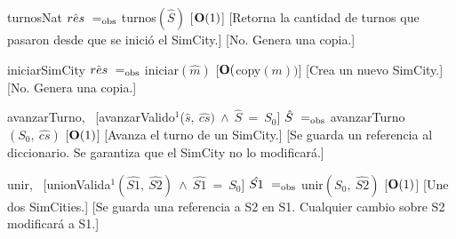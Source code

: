 \begin{Interfaz}
    \InterfazFuncion
    {turnos}{}{Nat}
    {$\hat{res}\ \igobs\ $turnos$(\hat{S})$}
    [$\bold{O}(1)$]
    [Retorna la cantidad de turnos que pasaron desde que se inició el SimCity.]
    [No. Genera una copia.]

    \InterfazFuncion
    {iniciar}{}{SimCity}
    {$\hat{res}\ \igobs\ $iniciar$(\hat{m})$}
    [$\bold{O}($copy$(m))$]
    [Crea un nuevo SimCity.]
    [No. Genera una copia.]

    \InterfazFuncion
    {avanzarTurno}{,\ }{}
    [avanzarValido$^{1}$($\hat{s},\ \hat{cs})\ \land\ \hat{S}\ =\ S_0$]
    {$\hat{S}\ \igobs\ $avanzarTurno$(S_0,\ \hat{cs})$}
    [$\bold{O}(1)$]
    [Avanza el turno de un SimCity.]
    [Se guarda un referencia al diccionario. Se garantiza que el SimCity no lo modificará.]

    \InterfazFuncion
    {unir}{,\ }{}
    [unionValida$^{1}(\hat{S1},\ \hat{S2})\ \land\ \hat{S1}\ =\ S_0$]
    {$\hat{S1}\ \igobs\ $unir$(S_0,\ \hat{S2})$}
    [$\bold{O}(1)$]
    [Une dos SimCities.]
    [Se guarda una referencia a S2 en S1. Cualquier cambio sobre S2 modificará a S1.]

    \vfill{}
\end{Interfaz}